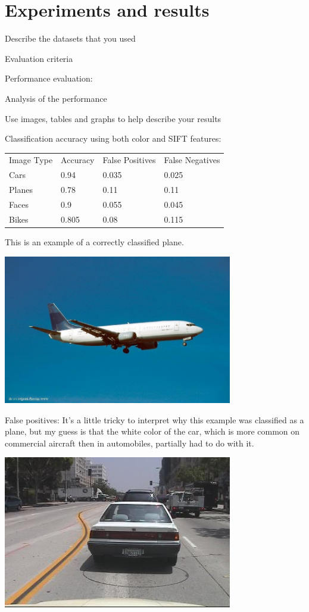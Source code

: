\documentclass[11pt]{article}
\begin{document}
\section{Experiments and results}

Describe the datasets that you used

Evaluation criteria

Performance evaluation:

Analysis of the performance

Use images, tables and graphs to help describe your results

Classification accuracy using both color and SIFT features:

\begin{tabular}{| l | l | l | l |}
  \hline
  Image Type & Accuracy     & False Positives    & False Negatives \\
  Cars      & 0.94  & 0.035 & 0.025 \\
  Planes    & 0.78  & 0.11  & 0.11  \\
  Faces     & 0.9   & 0.055 & 0.045 \\
  Bikes     & 0.805 & 0.08  & 0.115 \\
  \hline
\end{tabular}

This is an example of a correctly classified plane.

\includegraphics[width=100mm]{images/plane_true_positive.png}

False positives:
It's a little tricky to interpret why this example was classified as a
plane, but my guess is that the white color of the car, which is more
common on commercial aircraft then in automobiles, partially had to do
with it.

\includegraphics[width=100mm]{images/plane_false_positive.png}
\end{document}
